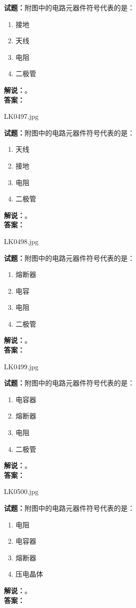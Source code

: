\documentclass{ctexbook}
\begin{document}
\noindent\textbf{试题：}附图中的电路元器件符号代表的是：
\begin{enumerate}[leftmargin=3em]
\item 接地
\item 天线
\item 电阻
\item 二极管
\end{enumerate}
\noindent\textbf{解说：}\textbf{}。\\\noindent\textbf{答案：}

\bigskip

LK0497.jpg


\noindent\textbf{试题：}附图中的电路元器件符号代表的是：
\begin{enumerate}[leftmargin=3em]
\item 天线
\item 接地
\item 电阻
\item 二极管
\end{enumerate}
\noindent\textbf{解说：}\textbf{}。\\\noindent\textbf{答案：}

\bigskip

LK0498.jpg


\noindent\textbf{试题：}附图中的电路元器件符号代表的是：
\begin{enumerate}[leftmargin=3em]
\item 熔断器
\item 电容
\item 电阻
\item 二极管
\end{enumerate}
\noindent\textbf{解说：}\textbf{}。\\\noindent\textbf{答案：}

\bigskip

LK0499.jpg


\noindent\textbf{试题：}附图中的电路元器件符号代表的是：
\begin{enumerate}[leftmargin=3em]
\item 电容器
\item 熔断器
\item 电阻
\item 二极管
\end{enumerate}
\noindent\textbf{解说：}\textbf{}。\\\noindent\textbf{答案：}

\bigskip

LK0500.jpg


\noindent\textbf{试题：}附图中的电路元器件符号代表的是：
\begin{enumerate}[leftmargin=3em]
\item 电阻
\item 电容器
\item 熔断器
\item 压电晶体
\end{enumerate}
\noindent\textbf{解说：}\textbf{}。\\\noindent\textbf{答案：}
\end{document}
